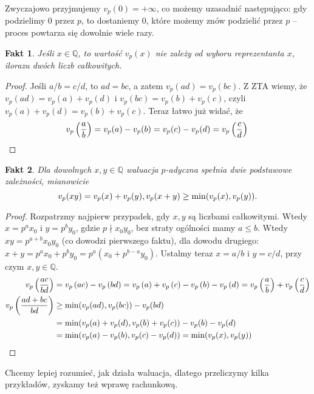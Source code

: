 \documentclass[a4paper,fleqn]{article}
\newtheorem{fkt}{Fakt}
\begin{document}
\begin{multicols}{2}
Zwyczajowo przyjmujemy $v_p(0) = +\infty$, co możemy uzasadnić następująco: gdy podzielimy $0$ przez $p$, to dostaniemy $0$, które możemy znów podzielić przez $p$ -- proces powtarza się dowolnie wiele razy.

\begin{fkt}Jeśli $x\in\mathbb Q$, to wartość $v_p(x)$ nie zależy od wyboru reprezentanta $x$, ilorazu dwóch liczb całkowitych.\end{fkt}

\begin{proof}Jeśli $a/b = c/d$, to $ad = bc$, a zatem $v_p(ad) = v_p(bc)$. Z ZTA wiemy, że $v_p(ad) = v_p(a) + v_p(d)$ i $v_p(bc)= v_p(b) + v_p(c)$, czyli $v_p(a) + v_p(d)  = v_p(b) + v_p(c)$. Teraz łatwo już widać, że \[v_p\left(\frac{a}{b}\right) = v_p(a)-v_p(b) = v_p(c) - v_p(d) = v_p\left(\frac{c}{d}\right)\qedhere\]\end{proof}


\begin{fkt}
Dla dowolnych $x,y \in \mathbb Q$ waluacja $p$-adyczna spełnia dwie podstawowe zależności, mianowicie
\[v_p(xy) = v_p(x) + v_p(y), \\ v_p(x+y) \ge \min(v_p(x), v_p(y)).\]

\end{fkt}
\begin{proof}Rozpatrzmy najpierw przypadek, gdy $x,y$ są liczbami całkowitymi. Wtedy $x = p^ax_0$ i $y=p^by_0$, gdzie $p\nmid x_0y_0$, bez straty ogólności mamy $a\le b$. Wtedy  $xy=p^{a+b}x_0y_0$ (co dowodzi pierwszego faktu), dla dowodu drugiego: $x+y=p^ax_0+p^by_0 = p^a\left(x_0+p^{b-a}y_0\right)$. Ustalmy teraz $x=a/b$ i $y=c/d$, przy czym $x,y\in\mathbb Q$.
\begin{align*}
v_p\left(\frac{ac}{bd}\right) & = v_p\left(ac\right) - v_p\left(bd\right)  = v_p\left(a\right) +v_p\left(c\right) - v_p\left(b\right) - v_p\left(d\right) = v_p\left(\frac{a}{b}\right) +v_p\left(\frac{c}{d}\right) \\
v_p\left(\frac{ad+bc}{bd}\right) & \ge \min(v_p(ad), v_p(bc)) - v_p(bd) \\ & = \min(v_p(a) + v_p(d), v_p(b) + v_p(c)) - v_p(b) -v_p(d) \notag\\
& = \min(v_p(a) - v_p(b), v_p(c) - v_p(d)) = \min(v_p(x), v_p(y)) \qedhere
\end{align*}
\end{proof}

Chcemy lepiej rozumieć, jak działa waluacja, dlatego przeliczymy kilka przykładów, zyskamy też wprawę rachunkową. 


\end{multicols}
\end{document}

